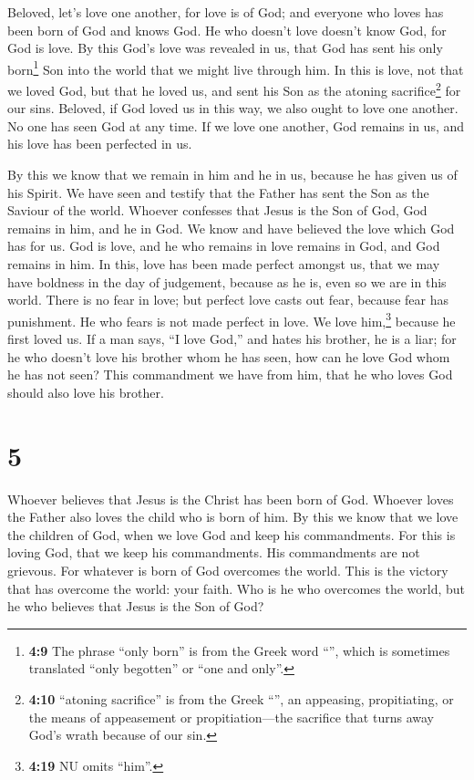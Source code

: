  Beloved, let's love one another, for love is of God; and
everyone who loves has been born of God and knows God.  He
who doesn't love doesn't know God, for God is love.  By
this God's love was revealed in us, that God has sent his only
born\footnote{\textbf{4:9} The phrase ``only born'' is from the Greek
  word ``'', which is sometimes translated ``only
  begotten'' or ``one and only''.} Son into the world that we might live
through him.  In this is love, not that we loved God, but
that he loved us, and sent his Son as the atoning sacrifice\footnote{\textbf{4:10}
  ``atoning sacrifice'' is from the Greek ``'', an
  appeasing, propitiating, or the means of appeasement or
  propitiation---the sacrifice that turns away God's wrath because of
  our sin.} for our sins.  Beloved, if God loved us in
this way, we also ought to love one another.  No one has
seen God at any time. If we love one another, God remains in us, and his
love has been perfected in us.

 By this we know that we remain in him and he in us,
because he has given us of his Spirit.  We have seen and
testify that the Father has sent the Son as the Saviour of the world.
 Whoever confesses that Jesus is the Son of God, God
remains in him, and he in God.  We know and have believed
the love which God has for us. God is love, and he who remains in love
remains in God, and God remains in him.  In this, love
has been made perfect amongst us, that we may have boldness in the day
of judgement, because as he is, even so we are in this world.
 There is no fear in love; but perfect love casts out
fear, because fear has punishment. He who fears is not made perfect in
love.  We love him,\footnote{\textbf{4:19} NU omits
  ``him''.} because he first loved us.  If a man says,
``I love God,'' and hates his brother, he is a liar; for he who doesn't
love his brother whom he has seen, how can he love God whom he has not
seen?  This commandment we have from him, that he who
loves God should also love his brother.

\hypertarget{section-4}{%
\section{5}\label{section-4}}

 Whoever believes that Jesus is the Christ has been born
of God. Whoever loves the Father also loves the child who is born of
him.  By this we know that we love the children of God,
when we love God and keep his commandments.  For this is
loving God, that we keep his commandments. His commandments are not
grievous.  For whatever is born of God overcomes the
world. This is the victory that has overcome the world: your faith.
 Who is he who overcomes the world, but he who believes
that Jesus is the Son of God?

